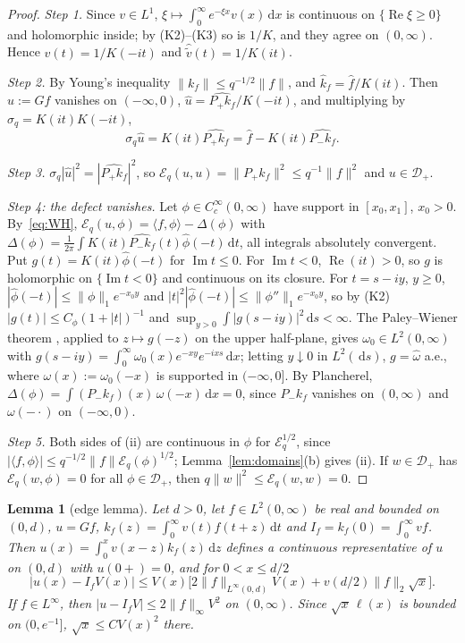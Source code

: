 \documentclass[11pt]{amsart}
\newcommand{\cE}{\mathcal{E}}
\newcommand{\dd}{\,\mathrm{d}}
\DeclareMathOperator{\re}{Re}
\DeclareMathOperator{\im}{Im}
\newtheorem{lemma}[theorem]{Lemma}
\theoremstyle{definition}
\theoremstyle{remark}
\numberwithin{equation}{section}
\begin{document}
\begin{proof}
\emph{Step 1.} Since $v\in L^1$, $\xi\mapsto\int_0^\infty e^{-\xi x}v(x)\dd x$ is continuous on $\{\re\xi\ge0\}$ and holomorphic inside; by (K2)--(K3) so is $1/K$, and they agree on $(0,\infty)$. Hence $\hat v(t)=1/K(-it)$ and $\hat{\tilde v}(t)=1/K(it)$.

\emph{Step 2.} By Young's inequality $\|k_f\|\le q^{-1/2}\|f\|$, and $\hat k_f=\hat f/K(it)$. Then $u:=Gf$ vanishes on $(-\infty,0)$, $\hat u=\widehat{P_+k_f}/K(-it)$, and multiplying by $\sigma_q=K(it)K(-it)$,
\begin{equation}\label{eq:WH}
\sigma_q\hat u=K(it)\widehat{P_+k_f}=\hat f-K(it)\widehat{P_-k_f}.
\end{equation}

\emph{Step 3.} $\sigma_q|\hat u|^2=|\widehat{P_+k_f}|^2$, so $\cE_q(u,u)=\|P_+k_f\|^2\le q^{-1}\|f\|^2$ and $u\in \mathcal D_+$.

\emph{Step 4: the defect vanishes.} Let $\phi\in C_c^\infty(0,\infty)$ have support in $[x_0,x_1]$, $x_0>0$. By~\eqref{eq:WH}, $\cE_q(u,\phi)=\langle f,\phi\rangle-\Delta(\phi)$ with $\Delta(\phi)=\frac1{2\pi}\int K(it)\widehat{P_-k_f}(t)\hat\phi(-t)\dd t$, all integrals absolutely convergent. Put $g(t)=K(it)\hat\phi(-t)$ for $\im t\le0$. For $\im t<0$, $\re(it)>0$, so $g$ is holomorphic on $\{\im t<0\}$ and continuous on its closure. For $t=s-iy$, $y\ge0$, $|\hat\phi(-t)|\le\|\phi\|_1e^{-x_0y}$ and $|t|^2|\hat\phi(-t)|\le\|\phi''\|_1e^{-x_0y}$, so by (K2) $|g(t)|\le C_\phi(1+|t|)^{-1}$ and $\sup_{y>0}\int|g(s-iy)|^2\dd s<\infty$. The Paley--Wiener theorem \cite[Thm.~19.2]{Rudin87}, applied to $z\mapsto g(-z)$ on the upper half-plane, gives $\omega_0\in L^2(0,\infty)$ with $g(s-iy)=\int_0^\infty\omega_0(x)e^{-xy}e^{-ixs}\dd x$; letting $y\downarrow0$ in $L^2(\dd s)$, $g=\hat\omega$ a.e., where $\omega(x):=\omega_0(-x)$ is supported in $(-\infty,0]$. By Plancherel, $\Delta(\phi)=\int(P_-k_f)(x)\,\omega(-x)\dd x=0$, since $P_-k_f$ vanishes on $(0,\infty)$ and $\omega(-\cdot)$ on $(-\infty,0)$.

\emph{Step 5.} Both sides of (ii) are continuous in $\phi$ for $\cE_q^{1/2}$, since $|\langle f,\phi\rangle|\le q^{-1/2}\|f\|\cE_q(\phi)^{1/2}$; Lemma~\ref{lem:domains}(b) gives (ii). If $w\in \mathcal D_+$ has $\cE_q(w,\phi)=0$ for all $\phi\in \mathcal D_+$, then $q\|w\|^2\le\cE_q(w,w)=0$.
\end{proof}

\begin{lemma}[edge lemma]\label{lem:edge}
Let $d>0$, let $f\in L^2(0,\infty)$ be real and bounded on $(0,d)$, $u=Gf$, $k_f(z)=\int_0^\infty v(t)f(t+z)\dd t$ and $I_f=k_f(0)=\int_0^\infty vf$. Then $u(x)=\int_0^xv(x-z)k_f(z)\dd z$ defines a continuous representative of $u$ on $(0,d)$ with $u(0+)=0$, and for $0<x\le d/2$
\begin{equation}\label{eq:edgelemma}
|u(x)-I_fV(x)|\le V(x)\bigl[2\|f\|_{L^\infty(0,d)}V(x)+v(d/2)\|f\|_2\sqrt x\bigr].
\end{equation}
If $f\in L^\infty$, then $|u-I_fV|\le2\|f\|_\infty V^2$ on $(0,\infty)$. Since $\sqrt x\,\ell(x)$ is bounded on $(0,e^{-1}]$, $\sqrt x\le CV(x)^2$ there.
\end{lemma}
\end{document}
